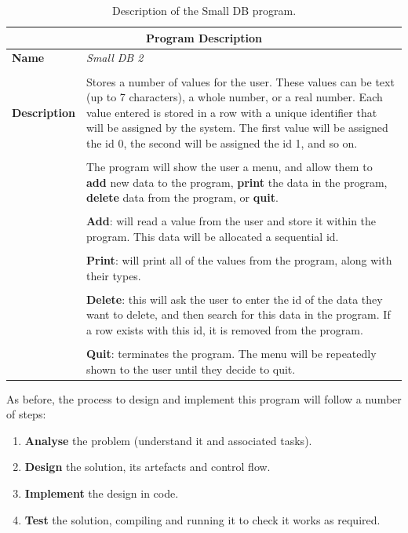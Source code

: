 \begin{table}[h]
\centering
\begin{tabular}{l|p{10cm}}
  \hline
  \multicolumn{2}{c}{\textbf{Program Description}} \\
  \hline
  \textbf{Name} & \emph{Small DB 2} \\
  \\
  \textbf{Description} & Stores a number of values for the user. These values can be text (up to 7 characters), a whole number, or a real number. Each value entered is stored in a row with a unique identifier that will be assigned by the system. The first value will be assigned the id 0, the second will be assigned the id 1, and so on.\\
  & \\
  & The program will show the user a menu, and allow them to \textbf{add} new data to the program, \textbf{print} the data in the program, \textbf{delete} data from the program, or \textbf{quit}.\\
  & \\
  & \textbf{Add}: will read a value from the user and store it within the program. This data will be allocated a sequential id. \\
  & \\
  & \textbf{Print}: will print all of the values from the program, along with their types. \\
  & \\
  & \textbf{Delete}: this will ask the user to enter the id of the data they want to delete, and then search for this data in the program. If a row exists with this id, it is removed from the program.\\
  & \\
  & \textbf{Quit}: terminates the program. The menu will be repeatedly shown to the user until they decide to quit. \\
  \hline
\end{tabular}
\caption{Description of the Small DB program.}
\label{tbl:small-db-2-prog}
\end{table}

As before, the process to design and implement this program will follow a number of steps:
\begin{enumerate}
  \item \textbf{Analyse} the problem (understand it and associated tasks).
  \item \textbf{Design} the solution, its artefacts and control flow.
  \item \textbf{Implement} the design in code.
  \item \textbf{Test} the solution, compiling and running it to check it works as required.
\end{enumerate}

